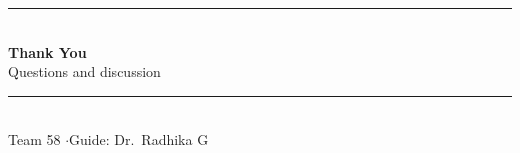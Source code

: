 \documentclass[aspectratio=169,11pt]{beamer}
\begin{document}
{
\begin{frame}[plain]
  \vfill
  \begin{center}
    {\color{navy}\rule{0.6\textwidth}{1pt}}\\[10pt]
    {\Large\color{navy}\bfseries Thank You}\\[8pt]
    {\small\color{steel} Questions and discussion}\\[10pt]
    {\color{navy}\rule{0.6\textwidth}{1pt}}\\[14pt]
    {\scriptsize\color{grayline} Team 58 \quad$\cdot$\quad Guide: Dr.\ Radhika G}
  \end{center}
  \vfill
\end{frame}}
\end{document}
